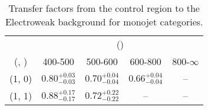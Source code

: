 \begin{table}[h!]
\tiny
\centering
\caption{Transfer factors from the \gj control region to the Electroweak background for monojet categories.\label{tab:tf_gj_total_mono}}
\begin{tabular}
{ccccc}
	\hline\hline
	& \multicolumn{4}{c}{\scalht (\gev)} \\ 
	 (\njet,  \nb) & 400-500 & 500-600 & 600-800 & 800-$\infty$ \\ [0.8ex] 
\hline
	(1, 0) & $0.80^{+ 0.03 }_{- 0.03 }$ & $0.70^{+ 0.04 }_{- 0.04 }$ & $0.66^{+ 0.04 }_{- 0.04 }$ & -- \\[0.5ex] 
	(1, 1) & $0.88^{+ 0.17 }_{- 0.17 }$ & $0.72^{+ 0.22 }_{- 0.22 }$ & -- & -- \\[0.5ex] 
	\hline
	\hline
\end{tabular}
\end{table}
